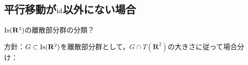 %
%
%
%
\subsection{平行移動が$\operatorname{id}$以外にない場合}
\begin{Q}
	$\operatorname{Is}(\mathbf R^2)$の離散部分群の分類？
\end{Q}

方針：$G\subset \operatorname{Is}(\mathbf R^2)$を離散部分群として，$G\cap T(\mathbf R^2)$の大きさに従って場合分け：

